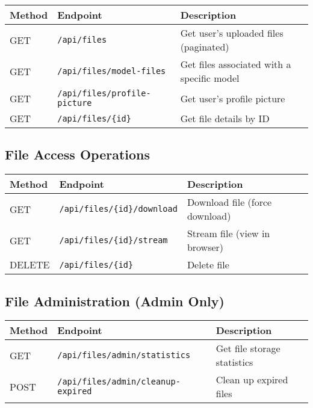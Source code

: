 \documentclass[12pt,a4paper]{article}
\begin{document}
\begin{longtable}{|p{}|p{}|p{}|}
\hline
\textbf{Method} & \textbf{Endpoint} & \textbf{Description} \\
\hline
\endhead

GET & \texttt{/api/files} & Get user's uploaded files (paginated) \\
GET & \texttt{/api/files/model-files} & Get files associated with a specific model \\
GET & \texttt{/api/files/profile-picture} & Get user's profile picture \\
GET & \texttt{/api/files/\{id\}} & Get file details by ID \\
\hline
\end{longtable}

\subsection{File Access Operations}

\begin{longtable}{|p{}|p{}|p{}|}
\hline
\textbf{Method} & \textbf{Endpoint} & \textbf{Description} \\
\hline
\endhead

GET & \texttt{/api/files/\{id\}/download} & Download file (force download) \\
GET & \texttt{/api/files/\{id\}/stream} & Stream file (view in browser) \\
DELETE & \texttt{/api/files/\{id\}} & Delete file \\
\hline
\end{longtable}

\subsection{File Administration (Admin Only)}

\begin{longtable}{|p{}|p{}|p{}|}
\hline
\textbf{Method} & \textbf{Endpoint} & \textbf{Description} \\
\hline
\endhead

GET & \texttt{/api/files/admin/statistics} & Get file storage statistics \\
POST & \texttt{/api/files/admin/cleanup-expired} & Clean up expired files \\
\hline
\end{longtable}
\end{document}
